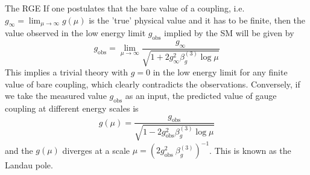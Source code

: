 \documentclass[11pt, a4paper]{article}
\newcommand{\jhkbf}[1]{\textbf{\color{red} [#1]}}
\begin{document}
The RGE 
If one postulates that the bare value of a coupling, i.e. $g_{\infty}=\lim_{\mu\rightarrow\infty} g(\mu)$ is the 'true' physical value and it has to be finite,
then the value observed in the low energy limit $g_{\text{obs}}$ implied by the SM will be given by
\begin{equation}
    g_{\text{obs}} = \lim_{\mu\rightarrow\infty} \frac{g_{\infty}}{\sqrt{1+2g_{\infty}^2\beta_g^{(3)}\log{\mu}}}
\end{equation}
This implies a trivial theory with $g=0$ in the low energy limit for any finite value of bare coupling, which clearly contradicts the observations.
Conversely, if we take the measured value $g_{\text{obs}}$ as an input, the predicted value of gauge coupling at different energy scales is
\begin{equation}
    g(\mu) = \frac{g_{\text{obs}}}{\sqrt{1-2g_{\text{obs}}^2 \beta_g^{(3)}\log{\mu}}}
\end{equation}
and the $g(\mu)$ diverges at a scale $\mu = \left(2 g_{\text{obs}}^2 \ \beta_{g}^{(3)} \right)^{-1} $.
This is known as the Landau pole.
\end{document}
